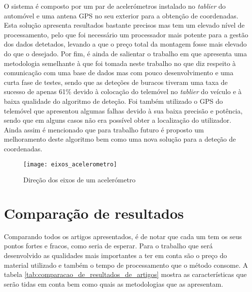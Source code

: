 O sistema é composto por um par de acelerómetros instalado no \emph{tablier} do automóvel e uma antena GPS no seu exterior para a obtenção de coordenadas.
Esta solução apresenta resultados bastante precisos mas tem um elevado nível de processamento, pelo que foi necessário um processador mais potente para a gestão dos dados detetados, levando a que o preço total da montagem fosse mais elevado do que o desejado. 
Por fim, é ainda de salientar o trabalho em \cite{Kattan2014} que apresenta uma metodologia semelhante à que foi tomada neste trabalho no que diz respeito à comunicação com uma base de dados mas com pouco desenvolvimento e uma curta fase de testes, sendo que as deteções de buracos tiveram uma taxa de sucesso de apenas 61\% devido à colocação do telemóvel no \emph{tablier} do veículo e à baixa qualidade do algoritmo de deteção.
Foi também utilizado o GPS do telemóvel que apresentou algumas falhas devido à sua baixa precisão e potência, sendo que em alguns casos não era possível obter a localização do utilizador.
Ainda assim é mencionado que para trabalho futuro é proposto um melhoramento deste algoritmo bem como uma nova solução para a deteção de coordenadas.

\begin{figure}[hbtp]
	\centering
	\texttt{[image: eixos\_acelerometro]}
	\caption[Direção dos eixos de um acelerómetro]{Direção dos eixos de um acelerómetro \footnotemark}
	\label{fig:direcao_dos_eixos_de_um_acelerometro}
\end{figure}


\section{Comparação de resultados} %
\label{sec:comapracao_de_resultados}

Comparando todos os artigos apresentados, é de notar que cada um tem os seus pontos fortes e fracos, como seria de esperar. Para o trabalho que será desenvolvido as qualidades mais importantes a ter em conta são o preço do material utilizado e também o tempo de processamento que o método consome. A tabela \ref{tab:comparacao_de_resultados_de_artigos} mostra as características que serão tidas em conta bem como quais as metodologias que as apresentam.

